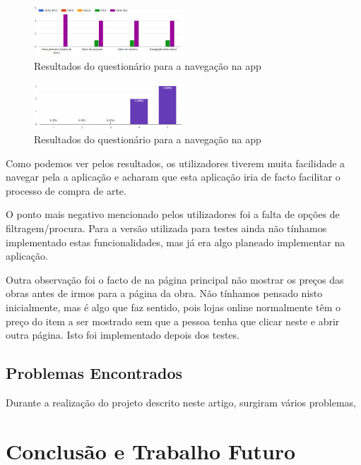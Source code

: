 \documentclass[conference]{IEEEtran}
\begin{document}
\begin{figure}[ht]
    \centering
    \includegraphics[width=0.5\textwidth]{questionarioNavegacao.png}
    \caption{Resultados do questionário para a navegação na app}
    \label{fig:navegacaoTest}
\end{figure}

\begin{figure}[ht]
    \centering
    \includegraphics[width=0.5\textwidth]{questionarioFacilitar.png}
    \caption{Resultados do questionário para a navegação na app}
    \label{fig:facilitaTest}
\end{figure}

Como podemos ver pelos resultados, os utilizadores tiverem muita facilidade a navegar pela a aplicação e acharam que esta aplicação iria de facto facilitar o processo de compra de arte.

O ponto mais negativo mencionado pelos utilizadores foi a falta de opções de filtragem/procura. Para a versão utilizada para testes ainda não tínhamos implementado estas funcionalidades, mas já era algo planeado implementar na aplicação.

Outra observação foi o facto de na página principal não mostrar os preços das obras antes de irmos para a página da obra. Não tínhamos pensado nisto inicialmente, mas é algo que faz sentido, pois lojas online normalmente têm o preço do item a ser mostrado sem que a pessoa tenha que clicar neste e abrir outra página. Isto foi implementado depois dos testes.

\subsection{Problemas Encontrados}

Durante a realização do projeto descrito neste artigo, surgiram vários problemas, 

\section{Conclusão e Trabalho Futuro}
\end{document}
